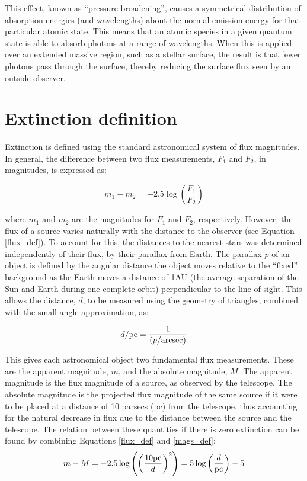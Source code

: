 \documentclass[12pt, a4paper]{report}
\begin{document}
This effect, known as ``pressure broadening'', causes a symmetrical distribution of absorption energies (and wavelengths) about the normal emission energy for that particular atomic state. This means that an atomic species in a given quantum state is able to absorb photons at a range of wavelengths. When this is applied over an extended massive region, such as a stellar surface, the result is that fewer photons pass through the surface, thereby reducing the surface flux seen by an outside observer.

\section{Extinction definition} \label{extinc_desc}
Extinction is defined using the standard astronomical system of flux magnitudes. In general, the difference between two flux measurements, $F_{1}$ and $F_{2}$, in magnitudes, is expressed as:

\begin{equation}
\label{mags_def}
m_{1} - m_{2} = -2.5\log \left( \frac{F_{1}}{F_{2}} \right)
\end{equation}

where $m_{1}$ and $m_{2}$ are the magnitudes for $F_{1}$ and $F_{2}$, respectively. However, the flux of a source varies naturally with the distance to the observer (see Equation \ref{flux_def}). To account for this, the distances to the nearest stars was determined independently of their flux, by their parallax from Earth. The parallax $p$ of an object is defined by the angular distance the object moves relative to the ``fixed'' background as the Earth moves a distance of 1AU (the average separation of the Sun and Earth during one complete orbit) perpendicular to the line-of-sight. This allows the distance, $d$, to be measured using the geometry of triangles, combined with the small-angle approximation, as:

\begin{equation}
d/\textnormal{pc} = \frac{1}{(p/\textnormal{arcsec})}
\end{equation}

This gives each astronomical object two fundamental flux measurements. These are the apparent magnitude, $m$, and the absolute magnitude, $M$. The apparent magnitude is the flux magnitude of a source, as observed by the telescope. The absolute magnitude is the projected flux magnitude of the same source if it were to be placed at a distance of 10 parsecs (pc) from the telescope, thus accounting for the natural decrease in flux due to the distance between the source and the telescope. The relation between these quantities if there is zero extinction can be found by combining Equations \ref{flux_def} and \ref{mags_def}:
\begin{equation}
\label{distance_modulus}
m - M = -2.5\log \left( \left(\frac{10\textnormal{pc}}{d}\right)^{2} \right) = 5\log\left(\frac{d}{\textnormal{pc}}\right) - 5
\end{equation}
\end{document}
